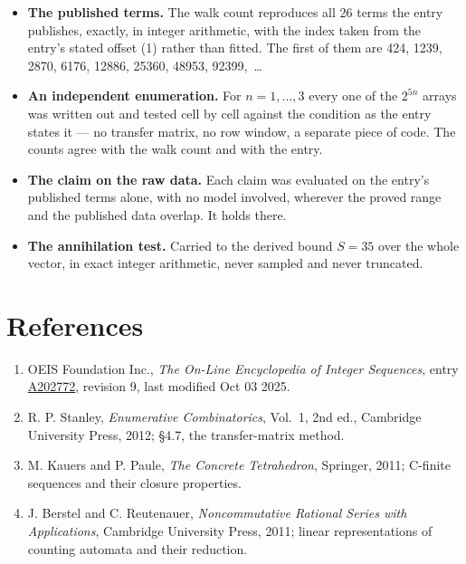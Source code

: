 \documentclass[11pt]{article}
\theoremstyle{definition}
\begin{document}
\begin{itemize}

\item {\bfseries The published terms.} The walk count reproduces all 26 terms the entry publishes, exactly, in integer arithmetic, with the index taken from the entry's stated offset (1) rather than fitted. The first of them are 424, 1239, 2870, 6176, 12886, 25360, 48953, 92399,~\dots

\item {\bfseries An independent enumeration.} For $n = 1,\dots,3$ every one of the $2^{5n}$ arrays was written out and tested cell by cell against the condition as the entry states it --- no transfer matrix, no row window, a separate piece of code. The counts agree with the walk count and with the entry.

\item {\bfseries The claim on the raw data.} Each claim was evaluated on the entry's published terms alone, with no model involved, wherever the proved range and the published data overlap. It holds there.

\item {\bfseries The annihilation test.} Carried to the derived bound $S = 35$ over the whole vector, in exact integer arithmetic, never sampled and never truncated.

\end{itemize}

\section{References}

\begin{enumerate}

\item OEIS Foundation Inc., \emph{The On-Line Encyclopedia of Integer Sequences}, entry \href{https://oeis.org/A202772}{A202772}, revision 9, last modified Oct 03 2025.

\item R. P. Stanley, \emph{Enumerative Combinatorics}, Vol.~1, 2nd ed., Cambridge University Press, 2012; \S4.7, the transfer-matrix method.

\item M. Kauers and P. Paule, \emph{The Concrete Tetrahedron}, Springer, 2011; C-finite sequences and their closure properties.

\item J. Berstel and C. Reutenauer, \emph{Noncommutative Rational Series with Applications}, Cambridge University Press, 2011; linear representations of counting automata and their reduction.

\end{enumerate}
\end{document}
